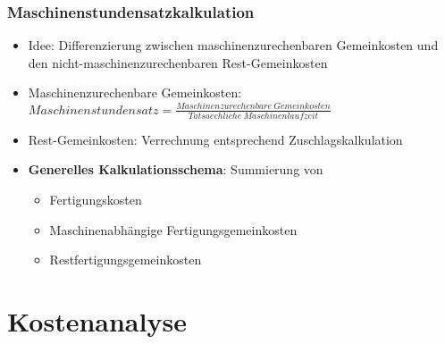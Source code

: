 \subsubsection{Maschinenstundensatzkalkulation}
\begin{itemize}
	\item Idee: Differenzierung zwischen maschinenzurechenbaren Gemeinkosten und den nicht-maschinenzurechenbaren Rest-Gemeinkosten
	\item Maschinenzurechenbare Gemeinkosten:\newline \(Maschinenstundensatz = \frac{Maschinenzurechenbare~Gemeinkosten}{Tatsaechliche~Maschinenlaufzeit}\)
	\item Rest-Gemeinkosten: Verrechnung entsprechend Zuschlagskalkulation
	\item \textbf{Generelles Kalkulationsschema}: Summierung von
	\begin{itemize}
		\item Fertigungskosten
		\item Maschinenabhängige Fertigungsgemeinkosten
		\item Restfertigungsgemeinkosten
	\end{itemize}
\end{itemize}



\section{Kostenanalyse}

